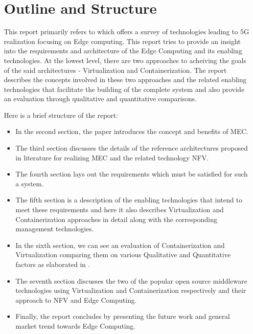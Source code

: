 \section{Outline and Structure}
This report primarily refers to \cite{taleb17} which offers a survey of technologies leading to 5G realization focusing on Edge computing. This report tries to provide an insight into the requirements and architecture of the Edge Computing and its enabling technologies. At the lowest level, there are two approaches to acheiving the goals of the said architectures - Virtualization and Containerization. The report describes the concepts involved in these two approaches and the related enabling technologies that facilitate the building of the complete system and also provide an evaluation through qualitative and quantitative comparisons. 

Here is a brief structure of the report:

\begin{itemize}
\item In the second section, the paper introduces the concept and benefits of MEC.

\item The third section discusses the details of the reference architectures proposed in literature for realizing MEC and the related technology NFV. 

\item The fourth section lays out the requirements which must be satisfied for such a system.

\item The fifth section is a description of the enabling technologies that intend to meet these requirements and here it also describes Virtualization and Containerization approaches in detail along with the corresponding management technologies. 

\item In the sixth section, we can see an evaluation of Containerization and Virtualization comparing them on various Qualitative and Quantitative factors as elaborated in \protect\cite{sharma16}. 

\item The seventh section discusses the two of the popular open source middleware technologies using Virtualization and Containerization respectively and their approach to NFV and Edge Computing. 

\item Finally, the report concludes by presenting the future work and general market trend towards Edge Computing.

\end{itemize}

